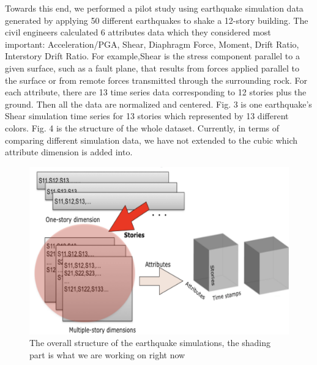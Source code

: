 Towards this end, we performed a pilot study using  earthquake simulation data generated by applying 50 different earthquakes to shake a 12-story building. The civil engineers calculated 6 attributes data which they considered most important: Acceleration/PGA, Shear, Diaphragm Force, Moment, Drift Ratio, Interstory Drift Ratio. For example,Shear is the stress component parallel to a given surface, such as a fault plane, that results from forces applied parallel to the surface or from remote forces transmitted through the surrounding rock. For each attribute, there are 13 time series data corresponding to 12 stories plus the ground. Then all the data are normalized and centered. Fig. 3 is one earthquake's Shear simulation time series for 13 stories which represented by 13 different colors. Fig. 4 is the structure of the whole dataset. Currently, in terms of comparing different simulation data, we have not extended to the cubic  which attribute dimension is added into.
\begin{figure}[h]
	\centering %
	\includegraphics[width=\columnwidth]{figs/structure} 
	\caption{The overall structure of the earthquake simulations, the shading part is what we are working on right now}
	\label{fig:data}
\end{figure}


